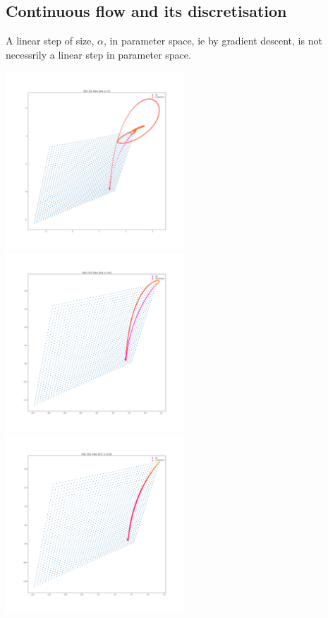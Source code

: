 \subsection{Continuous flow and its discretisation}

A linear step of size, \(\alpha\), in parameter space, ie by gradient
descent, is not necessrily a linear step in parameter space.

\includegraphics[width=0.5\textwidth,height=0.5\textheight]{../../pictures/figures/vi_sgd-vs-vi_mom_01.png}
\includegraphics[width=0.5\textwidth,height=0.5\textheight]{../../pictures/figures/vi_sgd-vs-vi_mom_001.png}
\includegraphics[width=0.5\textwidth,height=0.5\textheight]{../../pictures/figures/vi_sgd-vs-vi_mom_0001.png}


